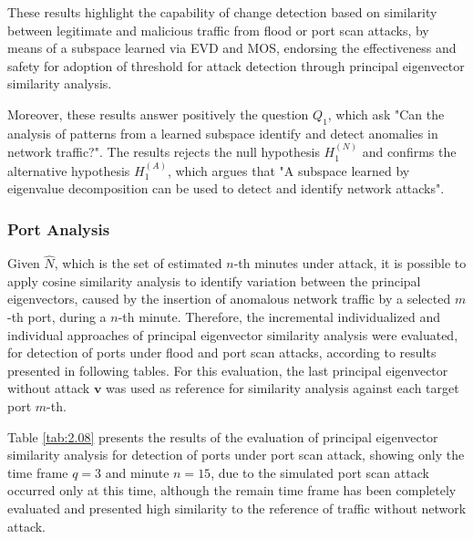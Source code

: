 These results highlight the capability of change detection based on similarity between legitimate and malicious traffic from flood or port scan attacks, by means of a subspace learned via EVD and MOS,
endorsing the effectiveness and safety for adoption of threshold for attack detection through principal eigenvector similarity analysis. 

Moreover, these results answer positively the question $Q_1$, which ask "Can the analysis of patterns from a learned subspace identify and detect anomalies in network traffic?". The results rejects the null hypothesis $H_1^{(N)}$ and confirms the alternative
hypothesis $H_1^{(A)}$, which argues that "A subspace learned by eigenvalue decomposition can be used to detect and identify network attacks".

\subsubsection{Port Analysis}
\label{sec:2_PortAnalysis}

Given $\hat{N}$, which is the set of estimated $n$-th minutes under attack, it is possible to apply cosine similarity analysis to identify variation between the principal eigenvectors, caused by the insertion of anomalous network traffic by a selected $m$-th port, during a $n$-th minute. Therefore, the incremental individualized and individual approaches of principal eigenvector similarity analysis were evaluated, for detection of ports under flood and port scan attacks, according to results presented in following tables. For this evaluation, the last principal eigenvector without attack $\pmb{v}$ was used as reference for similarity analysis against each target port $m$-th.

Table \ref{tab:2.08} presents the results of the evaluation of principal eigenvector similarity analysis for detection of ports under port scan attack, showing only the time frame $q=3$ and minute $n=15$, due to the simulated port scan attack occurred only at this time, although the remain time frame has been completely evaluated and presented high similarity to the reference of traffic without network attack.


